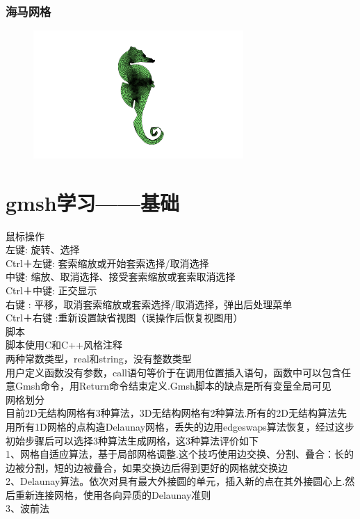 \documentclass[12pt]{article}
\begin{document}
\begin{CJK}{UTF8}{gkai}
\subsubsection{海马网格}

\begin{figure}[H]
	\centering
	\includegraphics[width=8cm]{haima.png}
	\caption{}  		
\end{figure}
\section{gmsh学习——基础}

鼠标操作\\

左键:       旋转、选择\\
Ctrl＋左键: 套索缩放或开始套索选择/取消选择\\
中键:       缩放、取消选择、接受套索缩放或套索取消选择\\
Ctrl＋中键: 正交显示\\
右键 :      平移，取消套索缩放或套索选择/取消选择，弹出后处理菜单\\
Ctrl＋右键 :重新设置缺省视图（误操作后恢复视图用）\\

脚本\\

脚本使用C和C++风格注释\\
两种常数类型，real和string，没有整数类型\\
用户定义函数没有参数，call语句等价于在调用位置插入语句，函数中可以包含任意Gmsh命令，用Return命令结束定义.Gmsh脚本的缺点是所有变量全局可见\\

网格划分\\

目前2D无结构网格有3种算法，3D无结构网格有2种算法.所有的2D无结构算法先用所有1D网格的点构造Delaunay网格，丢失的边用edgeswaps算法恢复，经过这步初始步骤后可以选择3种算法生成网格，这3种算法评价如下\\

 1、网格自适应算法，基于局部网格调整.这个技巧使用边交换、分割、叠合：长的边被分割，短的边被叠合，如果交换边后得到更好的网格就交换边\\
 2、Delaunay算法。依次对具有最大外接圆的单元，插入新的点在其外接圆心上.然后重新连接网格，使用各向异质的Delaunay准则\\
 3、波前法\\


\end{CJK}
\end{document}

